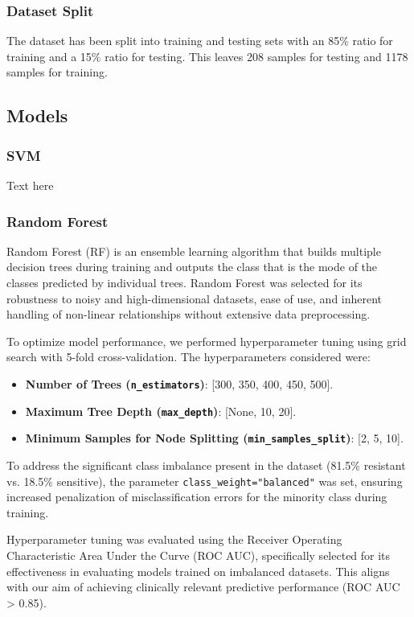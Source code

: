 \documentclass{article}
\begin{document}
\subsubsection{Dataset Split}

The dataset has been split into training and testing sets with an 85\% ratio for training and a 15\% ratio for testing. This leaves 208 samples for testing and 1178 samples for training.

\subsection{Models}
\subsubsection{SVM}
Text here

\subsubsection{Random Forest}
Random Forest (RF) is an ensemble learning algorithm that builds multiple decision trees during training and outputs the class that is the mode of the classes predicted by individual trees. Random Forest was selected for its robustness to noisy and high-dimensional datasets, ease of use, and inherent handling of non-linear relationships without extensive data preprocessing.

To optimize model performance, we performed hyperparameter tuning using grid search with 5-fold cross-validation. The hyperparameters considered were:

\begin{itemize}
    \item \textbf{Number of Trees (\texttt{n\_estimators})}: [300, 350, 400, 450, 500].
    \item \textbf{Maximum Tree Depth (\texttt{max\_depth})}: [None, 10, 20].
    \item \textbf{Minimum Samples for Node Splitting (\texttt{min\_samples\_split})}: [2, 5, 10].
\end{itemize}

To address the significant class imbalance present in the dataset (81.5\% resistant vs. 18.5\% sensitive), the parameter \texttt{class\_weight="balanced"} was set, ensuring increased penalization of misclassification errors for the minority class during training.

Hyperparameter tuning was evaluated using the Receiver Operating Characteristic Area Under the Curve (ROC AUC), specifically selected for its effectiveness in evaluating models trained on imbalanced datasets. This aligns with our aim of achieving clinically relevant predictive performance (ROC AUC > 0.85).
\end{document}
